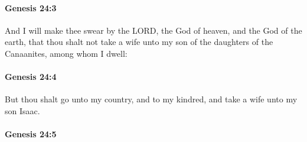 
		\paragraph{Genesis 24:3} %
			\label{GENESIS-24-3}

			And I will make thee swear by the LORD, the God of heaven, and the God of the earth, that thou shalt not take a wife unto my son of the daughters of the Canaanites, among whom I dwell:


		\paragraph{Genesis 24:4} %
			\label{GENESIS-24-4}

			But thou shalt go unto my country, and to my kindred, and take a wife unto my son Isaac.


		\paragraph{Genesis 24:5} %
			\label{GENESIS-24-5}

